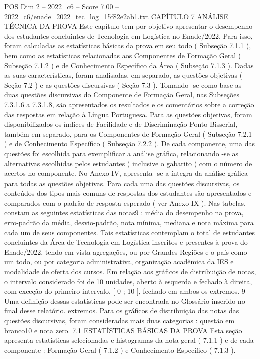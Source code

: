 \begin{textsample}{POS Dim 2 – 2022\_c6 – Score 7.00 – 2022\_c6/enade\_2022\_tec\_log\_15f82e2ab1.txt}  \label{ex:f2_pos_134}
CAPÍTULO 7 ANÁLISE TÉCNICA DA PROVA Este capítulo tem por objetivo apresentar o desempenho dos estudantes concluintes de Tecnologia em Logística no Enade/2022.
Para isso, foram calculadas as estatísticas básicas da prova em seu todo ( Subseção 7.1.1 ), bem como as estatísticas relacionadas aos Componentes de Formação Geral ( Subseção 7.1.2 ) e de Conhecimento Específico da Área ( Subseção 7.1.3 ).
Dadas as suas características, foram analisadas, em separado, as questões objetivas ( Seção 7.2 ) e as questões discursivas ( Seção 7.3 ).
Tomando -se como base as duas questões discursivas do Componente de Formação Geral, nas Subseções 7.3.1.6 a 7.3.1.8, são apresentados os resultados e os comentários sobre a correção das respostas em relação à Língua Portuguesa.
Para as questões objetivas, foram disponibilizados os índices de Facilidade e de Discriminação Ponto-Bisserial, também em separado, para os Componentes de Formação Geral ( Subseção 7.2.1 ) e de Conhecimento Específico ( Subseção 7.2.2 ).
De cada componente, uma das questões foi escolhida para exemplificar a análise gráfica, relacionando -se as alternativas escolhidas pelos estudantes ( inclusive o gabarito ) com o número de acertos no componente.
No Anexo IV, apresenta -se a íntegra da análise gráfica para todas as questões objetivas.
Para cada uma das questões discursivas, os conteúdos dos tipos mais comuns de respostas dos estudantes são apresentados e comparados com o padrão de resposta esperado ( ver Anexo IX ).
Nas tabelas, constam as seguintes estatísticas das notas9 : média do desempenho na prova, erro-padrão da média, desvio-padrão, nota mínima, mediana e nota máxima para cada um de seus componentes.
Tais estatísticas contemplam o total de estudantes concluintes da Área de Tecnologia em Logística inscritos e presentes à prova do Enade/2022, tendo em vista agregações, ou por Grandes Regiões e o país como um todo, ou por categoria administrativa, organização acadêmica da IES e modalidade de oferta dos cursos.
Em relação aos gráficos de distribuição de notas, o intervalo considerado foi de 10 unidades, aberto à esquerda e fechado à direita, com exceção do primeiro intervalo, [ 0 ; 10 ], fechado em ambos os extremos. 9 Uma definição dessas estatísticas pode ser encontrada no Glossário inserido no final desse relatório. extremos.
Para os gráficos de distribuição das notas das questões discursivas, foram consideradas mais duas categorias : questão em branco10 e nota zero. 7.1 ESTATÍSTICAS BÁSICAS DA PROVA Esta seção apresenta estatísticas selecionadas e histogramas da nota geral ( 7.1.1 ) e de cada componente : Formação Geral ( 7.1.2 ) e Conhecimento Específico ( 7.1.3 ).

\end{textsample}
